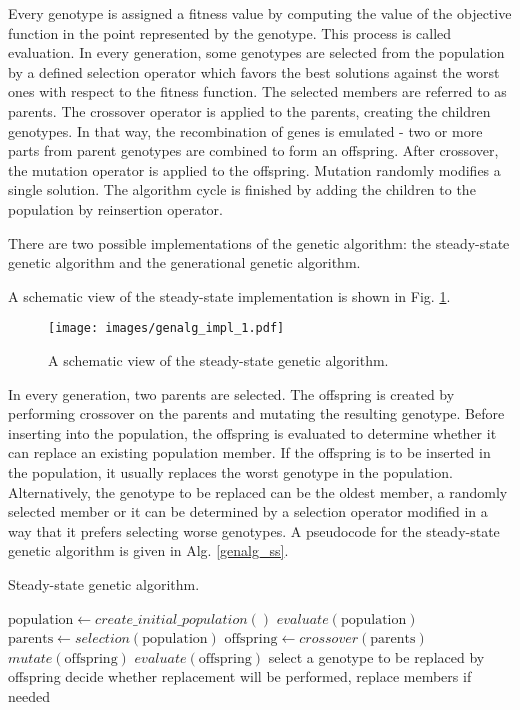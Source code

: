 Every genotype is assigned a fitness value by computing the value of the objective function in the point represented by the genotype.
This process is called evaluation.
In every generation, some genotypes are selected from the population by a defined selection operator which favors the best solutions against the worst ones with respect to the fitness function.
The selected members are referred to as parents.
The crossover operator is applied to the parents, creating the children genotypes.
In that way, the recombination of genes is emulated - two or more parts from parent genotypes are combined to form an offspring.
After crossover, the mutation operator is applied to the offspring.
Mutation randomly modifies a single solution.
The algorithm cycle is finished by adding the children to the population by reinsertion operator.

There are two possible implementations of the genetic algorithm: the steady-state genetic algorithm and the generational genetic algorithm.

A schematic view of the steady-state implementation is shown in Fig. \ref{genalg:impl_1}.
\begin{figure}[ht]
    \centering
    \texttt{[image: images/genalg\_impl\_1.pdf]}
    \caption{A schematic view of the steady-state genetic algorithm.}
    \label{genalg:impl_1}
\end{figure}
In every generation, two parents are selected.
The offspring is created by performing crossover on the parents and mutating the resulting genotype.
Before inserting into the population, the offspring is evaluated to determine whether it can replace an existing population member.
If the offspring is to be inserted in the population, it usually replaces the worst genotype in the population.
Alternatively, the genotype to be replaced can be the oldest member, a randomly selected member or it can be determined by a selection operator modified in a way that it prefers selecting worse genotypes.
A pseudocode for the steady-state genetic algorithm is given in Alg. \ref{genalg_ss}.
\begin{algorithm}
\caption{Steady-state genetic algorithm.\label{genalg_ss}}
\begin{algorithmic}[1]
\State $\text{population} \gets create\_initial\_population()$
\State $evaluate(\text{population})$
\State $\text{parents} \leftarrow selection(\text{population})$
\State $\text{offspring} \leftarrow crossover(\text{parents})$
\State $mutate(\text{offspring})$
\State $evaluate(\text{offspring})$
\State select a genotype to be replaced by offspring
\State decide whether replacement will be performed, replace members if needed
\EndWhile
\end{algorithmic}
\end{algorithm}

